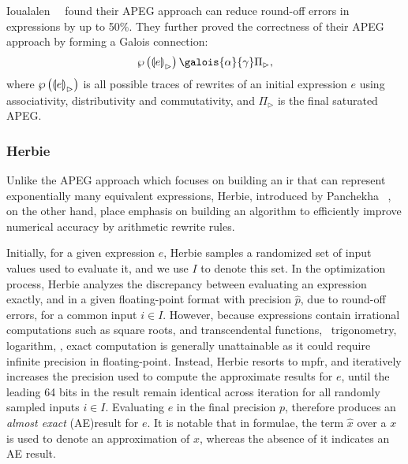 Ioualalen~\etal~\cite{ioualalen} found their APEG approach can reduce round-off
errors in expressions by up to 50\%.  They further proved the correctness of
their APEG approach by forming a Galois connection:
\begin{equation}
    \powersetof{{\llparenthesis e \rrparenthesis}_\rhd}
    \galois{\alpha}{\gamma}
    \Pi_\rhd,
\end{equation}
where $\wp\left({{\llparenthesis e \rrparenthesis}_\rhd}\right)$ is all possible
traces of rewrites of an initial expression $e$ using associativity,
distributivity and commutativity, and $\Pi_\rhd$ is the final saturated APEG\@.

\subsubsection{Herbie}

Unlike the APEG approach which focuses on building an \gls{ir} that can
represent exponentially many equivalent expressions, Herbie, introduced by
Panchekha \etal~\cite{panchekha15}, on the other hand, place emphasis on
building an algorithm to efficiently improve numerical accuracy by arithmetic
rewrite rules.

Initially, for a given expression $e$, Herbie samples a randomized set of
input values used to evaluate it, and we use $I$ to denote this set.  In the
optimization process, Herbie analyzes the discrepancy between evaluating
an expression exactly, and in a given floating-point format with precision
$\hat{p}$, due to round-off errors, for a common input $i \in I$.  However,
because expressions contain irrational computations such as square roots,
and transcendental functions, \eg~trigonometry, logarithm, \etc, exact
computation is generally unattainable as it could require infinite precision
in floating-point.  Instead, Herbie resorts to \gls{mpfr}, and iteratively
increases the precision used to compute the approximate results for $e$, until
the leading 64 bits in the result remain identical across iteration for all
randomly sampled inputs $i \in I$.  Evaluating $e$ in the final precision $p$,
therefore produces an \emph{almost exact} (AE)\footnotemark[3] result for $e$.
It is notable that in formulae, the term $\hat{x}$ over a $x$ is used to denote
an approximation of $x$, whereas the absence of it indicates an AE result.

